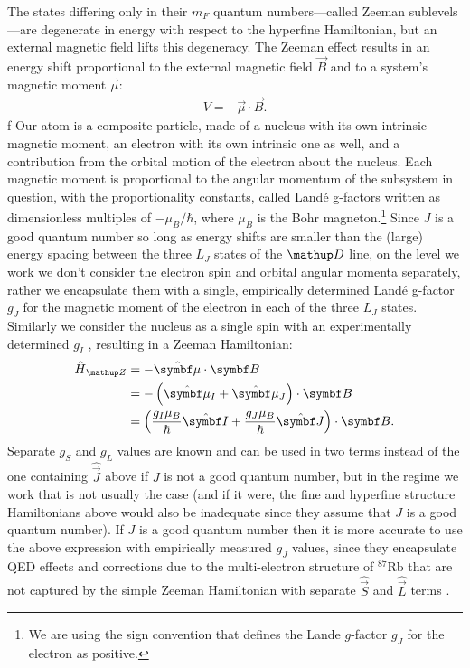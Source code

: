 The states differing only in their $m_F$ quantum numbers---called Zeeman sublevels---are degenerate in energy with respect to the hyperfine Hamiltonian, but an external magnetic field lifts this degeneracy. The Zeeman effect \cite{zeeman_influence_1897, steck_rubidium_2015} results in an energy shift proportional to the external magnetic field $\vec B$ and to a system's magnetic moment $\vec \mu$:
\begin{align}
V = - \vec\mu\cdot\vec B.
\end{align} f
Our atom is a composite particle, made of a nucleus with its own intrinsic magnetic moment, an electron with its own intrinsic one as well, and a contribution from the orbital motion of the electron about the nucleus. Each magnetic moment is proportional to the angular momentum of the subsystem in question, with the proportionality constants, called Land\'e g-factors written as dimensionless multiples of $-\mu_B/\hbar$, where $\mu_B$ is the Bohr magneton.\footnote{We are using the sign convention that defines the Lande $g$-factor $g_J$ for the electron as positive.} Since $J$ is a good quantum number so long as energy shifts are smaller than the (large) energy spacing between the three $L_J$ states of the $\up{D}$ line, on the level we work we don't consider the electron spin and orbital angular momenta separately, rather we encapsulate them with a single, empirically determined Land\'e g-factor $g_J$ \cite{steck_rubidium_2015} for the magnetic moment of the electron in each of the three $L_J$ states. Similarly we consider the nucleus as a single spin with an experimentally determined $g_I$ \cite{steck_rubidium_2015}, resulting in a Zeeman Hamiltonian:
\begin{align}
\hat H_\up{Z} & = -\hat{\vec \mu} \cdot \vec B\\
&= -\left(\hat{\vec \mu}_I + \hat{\vec \mu}_J\right) \cdot \vec B\\
&=\left(\frac{g_I\mu_B}{\hbar} \hat{\vec I} + \frac{g_J\mu_B}{\hbar} \hat{\vec J}\right) \cdot \vec B.\label{eq:H_Z}
\end{align}
Separate $g_S$ and $g_L$ values are known and can be used in two terms instead of the one containing $\hat{\vec J}$ above if $J$ is not a good quantum number, but in the regime we work that is not usually the case (and if it were, the fine and hyperfine structure Hamiltonians above would also be inadequate since they assume that $J$ is a good quantum number). If $J$ is a good quantum number then it is more accurate to use the above expression with empirically measured $g_J$ values, since they encapsulate QED effects and corrections due to the multi-electron structure of $^{87}$Rb that are not captured by the simple Zeeman Hamiltonian with separate $\hat{\vec S}$ and $\hat{\vec L}$ terms \cite{steck_rubidium_2015}. 

